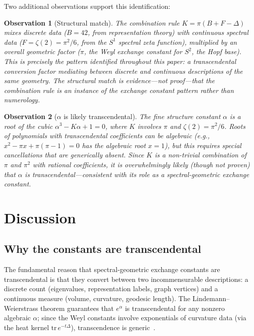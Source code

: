 \documentclass[aps,pra,twocolumn,superscriptaddress,longbibliography]{revtex4-2}
\newtheorem{observation}{Observation}
\begin{document}
Two additional observations support this identification:

\begin{observation}[Structural match]
The combination rule $K = \pi(B + F - \Delta)$ mixes discrete
data ($B = 42$, from representation theory) with continuous
spectral data ($F = \zeta(2) = \pi^2/6$, from the $S^1$
spectral zeta function), multiplied by an overall geometric
factor ($\pi$, the Weyl exchange constant for $S^2$, the Hopf
base).  This is precisely the pattern identified throughout this
paper: a transcendental conversion factor mediating between
discrete and continuous descriptions of the same geometry.
The structural match is evidence---not proof---that the
combination rule is an instance of the exchange constant pattern
rather than numerology.
\end{observation}

\begin{observation}[$\alpha$ is likely transcendental]
The fine structure constant $\alpha$ is a root of the cubic
$\alpha^3 - K\alpha + 1 = 0$, where $K$ involves $\pi$ and
$\zeta(2) = \pi^2/6$.  Roots of polynomials with transcendental
coefficients \textit{can} be algebraic (e.g., $x^2 - \pi x +
\pi(\pi - 1) = 0$ has the algebraic root $x = 1$), but this
requires special cancellations that are generically absent.
Since $K$ is a non-trivial combination of $\pi$ and $\pi^2$
with rational coefficients, it is overwhelmingly likely
(though not proven) that $\alpha$ is transcendental---consistent
with its role as a spectral-geometric exchange constant.
\end{observation}



\section{Discussion}
\label{sec:discussion}

\subsection{Why the constants are transcendental}

The fundamental reason that spectral-geometric exchange constants
are transcendental is that they convert between two
incommensurable descriptions: a discrete count (eigenvalues,
representation labels, graph vertices) and a continuous measure
(volume, curvature, geodesic length).  The Lindemann--Weierstrass
theorem guarantees that $e^\alpha$ is transcendental for any
nonzero algebraic $\alpha$; since the Weyl constants involve
exponentials of curvature data (via the heat kernel
$\mathrm{tr}\,e^{-t\Delta}$), transcendence is
generic~\cite{berger2003}.
\end{document}
